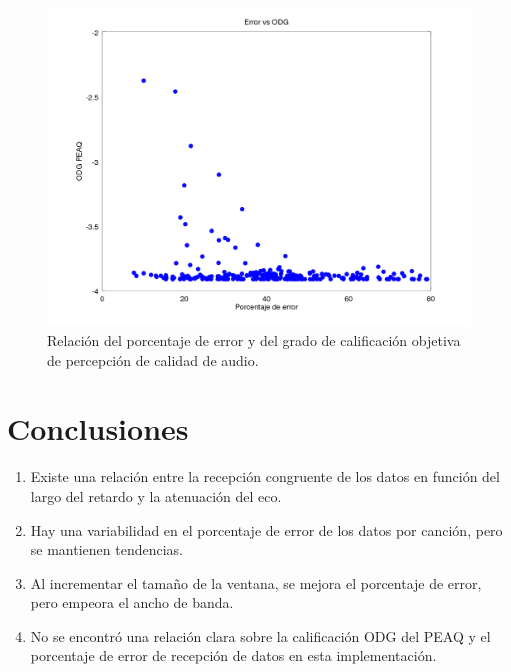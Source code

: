 \documentclass[conference]{IEEEtran}
\begin{document}
\begin{figure}[h]
\centering
\includegraphics[scale=0.5]{errvsodg.png}
\caption{Relación del porcentaje de error y del grado de calificación objetiva de percepción de calidad de audio.}
\label{fig:odg}
\end{figure}

\section{Conclusiones}
\begin{enumerate}
\item Existe una relación entre la recepción congruente de los datos en función del largo del retardo y la atenuación del eco.
\item Hay una variabilidad en el porcentaje de error de los datos por canción, pero se mantienen tendencias.
\item Al incrementar el tamaño de la ventana, se mejora el porcentaje de error, pero empeora el ancho de banda.
\item No se encontró una relación clara sobre la calificación ODG del PEAQ y el porcentaje de error de recepción de datos en esta implementación.
\end{enumerate}
\end{document}
